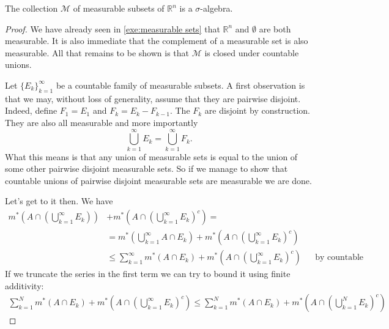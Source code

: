 \documentclass[12pt,oneside]{book}
\numberwithin{table}{section}
\numberwithin{equation}{section}
\numberwithin{figure}{section}
\newcommand{\R}{\mathbb{R}}
\newcommand{\M}{\mathcal{M}}
\newcommand{\ext}[1]{m^* \! \left( #1 \right)}
\begin{document}
\begin{proposition}
	The collection \( \M \) of measurable subsets of \( \R^n \) is a \( \sigma \)-algebra.
\end{proposition}
\begin{proof}
	We have already seen in \cref{exe:measurable sets} that \( \R^n \) and \( \emptyset \) are both measurable. It is also immediate that the complement of a measurable set is also measurable. All that remains to be shown is that \( \M \) is closed under countable unions. 

	Let \( \{ E_k \}_{k = 1}^\infty \) be a countable family of measurable subsets. A first observation is that we may, without loss of generality, assume that they are pairwise disjoint. Indeed, define \( F_1 = E_1 \) and \( F_k = E_{k} - F_{k-1} \). The \( F_k \) are disjoint by construction. They are also all measurable and more importantly
	\begin{equation*}
		\bigcup_{k = 1}^\infty E_k = \bigcup_{k = 1}^\infty	F_k.
	\end{equation*}
	What this means is that any union of measurable sets is equal to the union of some other pairwise disjoint measurable sets. So if we manage to show that countable unions of pairwise disjoint measurable sets are measurable we are done. 

	Let's get to it then. We have
	\begin{align*}
		\ext{A \cap \left(\bigcup_{k = 1}^\infty E_k\right)} & + \ext{A \cap \left(\bigcup_{k = 1}^\infty E_k\right)^c} = && \\
																											 	 & = \ext{\bigcup_{k = 1}^\infty A \cap E_k} + \ext{A \cap \left(\bigcup_{k = 1}^\infty E_k\right)^c} && \\
																											 	 & \leq \sum_{k = 1}^{\infty}\ext{A \cap E_k} + \ext{A \cap \left(\bigcup_{k = 1}^\infty E_k\right)^c} && \text{by countable subadditivity.} 
	\end{align*}
	If we truncate the series in the first term we can try to bound it using finite additivity:
	\begin{align*}
		\sum_{k = 1}^{N} \ext{A \cap E_k} + \ext{A \cap \left(\bigcup_{k = 1}^\infty E_k\right)^c} \leq \sum_{k = 1}^{N} \ext{A \cap E_k} + \ext{A \cap \left(\bigcup_{k = 1}^N E_k\right)^c} 
	\end{align*}

\end{proof}
\end{document}
